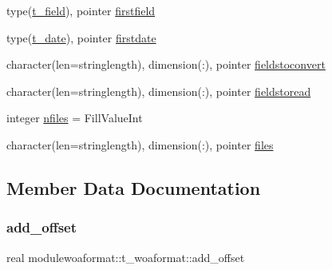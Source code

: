 \begin{DoxyCompactItemize}
\item 
type(\mbox{\hyperlink{structmodulewoaformat_1_1t__field}{t\+\_\+field}}), pointer \mbox{\hyperlink{structmodulewoaformat_1_1t__woaformat_af3157c87393bda0d63d8cb13b9d3f3f2}{firstfield}}
\item 
type(\mbox{\hyperlink{structmodulewoaformat_1_1t__date}{t\+\_\+date}}), pointer \mbox{\hyperlink{structmodulewoaformat_1_1t__woaformat_afffc3b7986eabdee940ed5af8f8cf91a}{firstdate}}
\item 
character(len=stringlength), dimension(\+:), pointer \mbox{\hyperlink{structmodulewoaformat_1_1t__woaformat_ae03550b393d1c2e38ef7320d6062aa8b}{fieldstoconvert}}
\item 
character(len=stringlength), dimension(\+:), pointer \mbox{\hyperlink{structmodulewoaformat_1_1t__woaformat_a0932c296832a77bbb08e9d632dc0edaf}{fieldstoread}}
\item 
integer \mbox{\hyperlink{structmodulewoaformat_1_1t__woaformat_a2de1b3e7b99559e658f930f4c92f1f43}{nfiles}} = Fill\+Value\+Int
\item 
character(len=stringlength), dimension(\+:), pointer \mbox{\hyperlink{structmodulewoaformat_1_1t__woaformat_a51f4ad38cdd5128c38a79a27bae1537c}{files}}
\end{DoxyCompactItemize}


\subsection{Member Data Documentation}
\mbox{\label{structmodulewoaformat_1_1t__woaformat_aba7386316d233f45c3f9a203a5125d68}} 
\subsubsection{\texorpdfstring{add\+\_\+offset}{add\_offset}}
{\footnotesize\ttfamily real modulewoaformat\+::t\+\_\+woaformat\+::add\+\_\+offset\hspace{0.3cm}{\ttfamily [private]}}

\mbox{\label{structmodulewoaformat_1_1t__woaformat_a68ba7c236e756477f1f16c7952cfa402}} 
